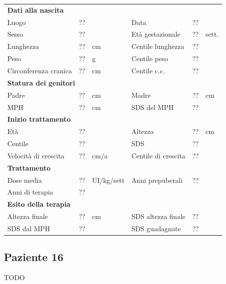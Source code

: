 \begin{table}[!h]
\begin{tabular}{lrllrl}
\toprule
\multicolumn{6}{l}{\textbf{Dati alla nascita}}\\
Luogo 		& \multicolumn{2}{l}{??} 	& Data 					& \multicolumn{2}{l}{??} 	\\
Sesso 		& \multicolumn{2}{l}{??} 	& Età gestazionale 		& ?? 		& sett.\\
Lunghezza 	& ?? 		& cm 				& Centile lunghezza		& ?? 		\\
Peso 		& ?? 		& g					& Centile peso			& ?? 		\\
Circonferenza cranica	& ?? 		& cm 	& Centile c.c.			& ?? \\
\midrule
\multicolumn{6}{l}{\textbf{Statura dei genitori}}\\
Padre 		& ?? & cm 	& Madre 				& ?? & cm \\
MPH 		& ?? & cm 	& SDS del MPH 			& ??\\
\midrule
\multicolumn{6}{l}{\textbf{Inizio trattamento}} \\
Età	& ?? & 		& Altezza 				& ?? & cm  \\
Centile & ?? 	 &		& SDS		& ?? \\
Velocità di crescita & ?? & cm/a	& Centile di crescita & ??\\
\midrule
\multicolumn{6}{l}{\textbf{Trattamento}} \\
Dose media		& ?? & UI/kg/sett & Anni prepuberali & ??\\
Anni di terapia & ??\\
\midrule
\multicolumn{6}{l}{\textbf{Esito della terapia}} \\
Altezza finale			& ?? & cm 	& SDS altezza finale		& ??\\
SDS dal MPH				& ?? &		& SDS guadagnate 			& ??\\
\bottomrule
\end{tabular}
\end{table}
\clearpage


\subsection*{Paziente 16}

TODO

